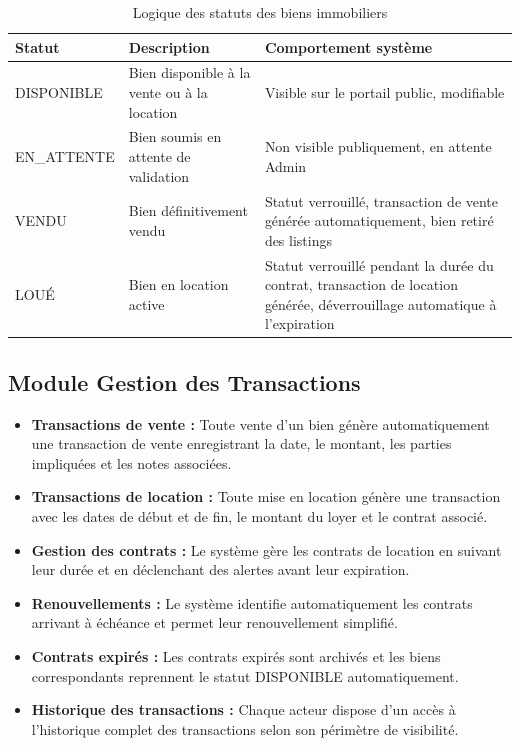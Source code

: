 \documentclass[a4paper,12pt]{report}
\begin{document}
\begin{table}[H]
\centering
\begin{tabular}{|p{3cm}|p{5cm}|p{6cm}|}
\hline
\textbf{Statut} & \textbf{Description} & \textbf{Comportement système} \\
\hline
DISPONIBLE & Bien disponible à la vente ou à la location & Visible sur le portail public, modifiable \\
\hline
EN\_ATTENTE & Bien soumis en attente de validation & Non visible publiquement, en attente Admin \\
\hline
VENDU & Bien définitivement vendu & Statut verrouillé, transaction de vente générée automatiquement, bien retiré des listings \\
\hline
LOUÉ & Bien en location active & Statut verrouillé pendant la durée du contrat, transaction de location générée, déverrouillage automatique à l'expiration \\
\hline
\end{tabular}
\caption{Logique des statuts des biens immobiliers}
\label{tab:statuts-biens}
\end{table}

\subsection{Module Gestion des Transactions}

\begin{itemize}
    \item \textbf{Transactions de vente :} Toute vente d'un bien génère automatiquement une transaction de vente enregistrant la date, le montant, les parties impliquées et les notes associées.
    \item \textbf{Transactions de location :} Toute mise en location génère une transaction avec les dates de début et de fin, le montant du loyer et le contrat associé.
    \item \textbf{Gestion des contrats :} Le système gère les contrats de location en suivant leur durée et en déclenchant des alertes avant leur expiration.
    \item \textbf{Renouvellements :} Le système identifie automatiquement les contrats arrivant à échéance et permet leur renouvellement simplifié.
    \item \textbf{Contrats expirés :} Les contrats expirés sont archivés et les biens correspondants reprennent le statut DISPONIBLE automatiquement.
    \item \textbf{Historique des transactions :} Chaque acteur dispose d'un accès à l'historique complet des transactions selon son périmètre de visibilité.
\end{itemize}
\end{document}
